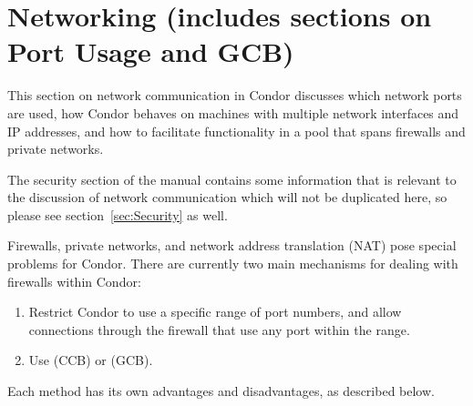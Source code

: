 \section{\label{sec:Networking}Networking (includes sections on Port Usage and GCB)}

This section on
network communication in Condor
discusses which network ports are used,
how Condor behaves on machines with multiple network interfaces
and IP addresses,
and how to facilitate functionality in a pool that spans
firewalls and private networks.

The security section of the manual contains some
information that is relevant to the discussion of network
communication which will not be duplicated here, so please
see section~\ref{sec:Security} as well.

Firewalls, private networks, and network address translation (NAT)
pose special problems for Condor.
There are currently two main mechanisms for dealing with firewalls
within Condor:

\begin{enumerate}

\item Restrict Condor to use a specific range of port numbers, and
  allow connections through the firewall that use any port within the
  range.

\item Use  (CCB) or  (GCB).

\end{enumerate}

Each method has its own advantages and disadvantages,
as described below.












